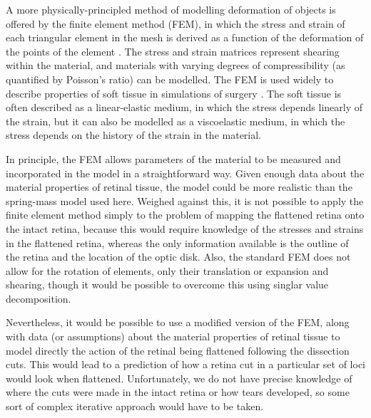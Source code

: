 \documentclass[10pt]{article}
\begin{document}
A more physically-principled method of modelling deformation of
objects is offered by the finite element method (FEM), in which the
stress and strain of each triangular element in the mesh is derived as
a function of the deformation of the points of the element
\cite{ZienTayl00fini}. The stress and strain matrices represent
shearing within the material, and materials with varying degrees of
compressibility (as quantified by Poisson's ratio) can be modelled.
The FEM is used widely to describe properties of soft tissue in
simulations of surgery \cite{CartEtal05appl}. The soft tissue is often
described as a linear-elastic medium, in which the stress depends
linearly of the strain, but it can also be modelled as a viscoelastic
medium, in which the stress depends on the history of the strain in
the material.


In principle, the FEM allows parameters of the material to be measured
and incorporated in the model in a straightforward way. Given enough
data about the material properties of retinal tissue, the model could
be more realistic than the spring-mass model used here.  Weighed
against this, it is not possible to apply the finite element method
simply to the problem of mapping the flattened retina onto the intact
retina, because this would require knowledge of the stresses and
strains in the flattened retina, whereas the only information
available is the outline of the retina and the location of the optic
disk. Also, the standard FEM does not allow for the rotation of
elements, only their translation or expansion and shearing, though it
would be possible to overcome this using singlar value decomposition.

Nevertheless, it would be possible to use a modified version of the
FEM, along with data (or assumptions) about the material properties of
retinal tissue to model directly the action of the retinal being
flattened following the dissection cuts. This would lead to a
prediction of how a retina cut in a particular set of loci would look
when flattened. Unfortunately, we do not have precise knowledge of
where the cuts were made in the intact retina or how tears developed,
so some sort of complex iterative approach would have to be taken.

\end{document}
